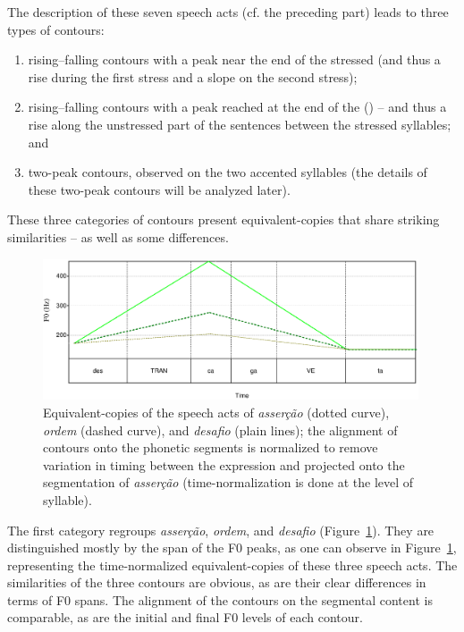 \documentclass[output=paper]{LSP/langsci}
\begin{document}
The  description of these seven speech acts (cf. the preceding part) leads to three types of contours: 
\begin{enumerate}
\item rising–falling contours with a peak near the end of the  stressed  (and thus a rise during the first stress and a slope on the second stress); 
\item rising–falling contours with a peak reached at the end of the  () -- and thus a rise along the unstressed part of the sentences between the stressed syllables; and 
\item two-peak contours, observed on the two accented syllables (the details of these two-peak contours will be analyzed later).
\end{enumerate}

These three categories of contours present equivalent-copies that share striking similarities -- as well as some differences.


\begin{figure}[t]
\includegraphics[width=0.99\textwidth]{figures/MOR10.eps}
\caption{Equivalent-copies of the speech acts of \textit{asserção} (dotted curve), \textit{ordem} (dashed curve), and \textit{desafio} (plain lines); the alignment of contours onto the phonetic segments is normalized to remove variation in timing between the expression and projected onto the segmentation of \textit{asserção} (time-normalization is done at the level of syllable).}
\label{figure:EC1}
\end{figure}

The first category regroups \textit{asserção}, \textit{ordem}, and \textit{desafio} (Figure~\ref{figure:EC1}). 
They are distinguished mostly by the span of the F0 peaks, as one can observe in Figure~\ref{figure:EC1}, representing the time-normalized equivalent-copies of these three speech acts. 
The similarities of the three contours are obvious, as are their clear differences in terms of F0 spans. 
The alignment of the contours on the segmental content is comparable, as are the initial and final F0 levels of each contour.
\end{document}
